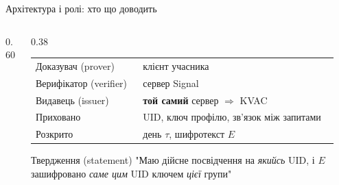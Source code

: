 \documentclass[aspectratio=169, 10pt, xcolor=svgnames]{beamer}
\begin{document}

\begin{frame}{Архітектура і ролі: хто що доводить}
  \begin{columns}[c]
    \begin{column}{0.60\textwidth}
      \centering
      \resizebox{\linewidth}{!}{}
    \end{column}
    \begin{column}{0.38\textwidth}
      \small
      \begin{tabular}{@{}p{0.34\linewidth}p{0.62\linewidth}@{}}
        \toprule
        Доказувач (prover)       & клієнт учасника \\
        Верифікатор (verifier)   & сервер Signal \\
        Видавець (issuer)        & \textbf{той самий} сервер $\Rightarrow$ KVAC\footnotemark[1] \\
        Приховано                & UID, ключ профілю, зв'язок між запитами \\
        Розкрито                 & день $\tau$, шифротекст $E$ \\
        \bottomrule
      \end{tabular}\par\medskip
      \begin{block}{Твердження (statement)}
        \footnotesize "Маю дійсне посвідчення на \emph{якийсь} UID, і $E$ зашифровано \emph{саме цим} UID 
        ключем \emph{цієї} групи"{}
      \end{block}
    \end{column}
  \end{columns}
\end{frame}

\end{document}
